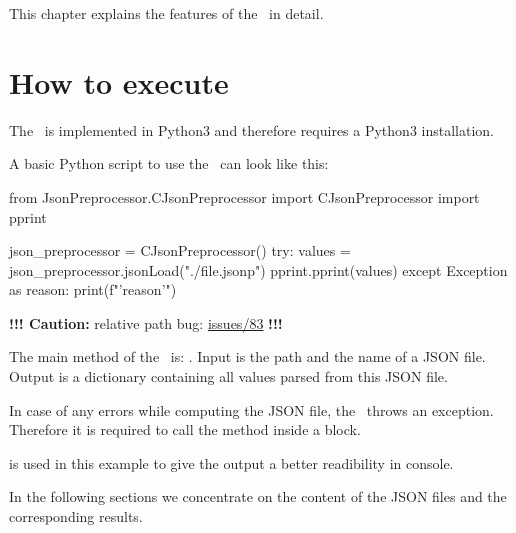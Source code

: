 



This chapter explains the features of the \pkg\ in detail.

\section{How to execute}

The \pkg\ is implemented in Python3 and therefore requires a Python3 installation.

A basic Python script to use the \pkg\ can look like this:

\begin{pythoncode}
from JsonPreprocessor.CJsonPreprocessor import CJsonPreprocessor
import pprint

json_preprocessor = CJsonPreprocessor()
try:
   values = json_preprocessor.jsonLoad("./file.jsonp")
   pprint.pprint(values)
except Exception as reason:
   print(f"'{reason}'")
\end{pythoncode}

\textbf{!!! Caution:} relative path bug:
\href{https://github.com/test-fullautomation/python-jsonpreprocessor/issues/83}{issues/83} \textbf{!!!}

The main method of the \pkg\ is: . Input is the path and the name of a JSON file.
Output is a dictionary containing all values parsed from this JSON file.

In case of any errors while computing the JSON file, the \pkg\ throws an exception. Therefore it is required
to call the method  inside a  block.

 is used in this example to give the output a better readibility in console.

In the following sections we concentrate on the content of the JSON files and the corresponding results.

